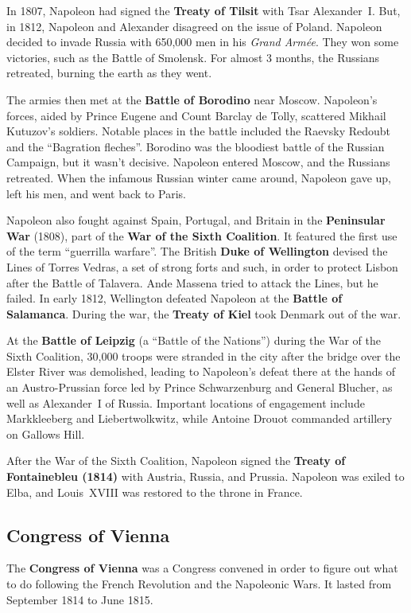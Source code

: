In 1807, Napoleon had signed the \textbf{Treaty of Tilsit} with Tsar Alexander~I.
But, in 1812, Napoleon and Alexander disagreed on the issue of Poland.
Napoleon decided to invade Russia with 650,000 men in his \textit{Grand Arm\'ee}.
They won some victories, such as the Battle of Smolensk.
For almost 3 months, the Russians retreated, burning the earth as they went.

The armies then met at the \textbf{Battle of Borodino} near Moscow.
Napoleon's forces, aided by Prince Eugene and Count Barclay de Tolly, scattered Mikhail Kutuzov's soldiers.
Notable places in the battle included the Raevsky Redoubt and the ``Bagration fleches''.
Borodino was the bloodiest battle of the Russian Campaign, but it wasn't decisive.
Napoleon entered Moscow, and the Russians retreated.
When the infamous Russian winter came around, Napoleon gave up, left his men, and went back to Paris.

Napoleon also fought against Spain, Portugal, and Britain in the \textbf{Peninsular War} (1808),
part of the \textbf{War of the Sixth Coalition}.
It featured the first use of the term ``guerrilla warfare''.
The British \textbf{Duke of Wellington} devised the Lines of Torres Vedras, a set of strong forts and such,
in order to protect Lisbon after the Battle of Talavera.
Ande Massena tried to attack the Lines, but he failed.
In early 1812, Wellington defeated Napoleon at the \textbf{Battle of Salamanca}.
During the war, the \textbf{Treaty of Kiel} took Denmark out of the war.

At the \textbf{Battle of Leipzig} (a ``Battle of the Nations'') during the War of the Sixth Coalition,
30,000 troops were stranded in the city after the bridge over the Elster River was demolished,
leading to Napoleon's defeat there at the hands of an Austro-Prussian force
led by Prince Schwarzenburg and General Blucher, as well as Alexander~I of Russia.
Important locations of engagement include Markkleeberg and Liebertwolkwitz,
while Antoine Drouot commanded artillery on Gallows Hill.

After the War of the Sixth Coalition,
Napoleon signed the \textbf{Treaty of Fontainebleu (1814)} with Austria, Russia, and Prussia.
Napoleon was exiled to Elba, and Louis~XVIII was restored to the throne in France.

\subsection*{Congress of Vienna}

The \textbf{Congress of Vienna} was a Congress convened in order to figure out what to do
following the French Revolution and the Napoleonic Wars.
It lasted from September 1814 to June 1815.

